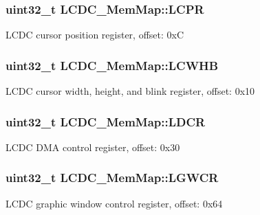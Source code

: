 \subsubsection[{L\+C\+P\+R}]{\setlength{\rightskip}{0pt plus 5cm}uint32\+\_\+t L\+C\+D\+C\+\_\+\+Mem\+Map\+::\+L\+C\+P\+R}\label{struct_l_c_d_c___mem_map_a54db054fbd1e4a7de44253909bbc8944}
L\+C\+D\+C cursor position register, offset\+: 0x\+C \hypertarget{struct_l_c_d_c___mem_map_a5766a743e828957c73257ebd66133a92}{}
\subsubsection[{L\+C\+W\+H\+B}]{\setlength{\rightskip}{0pt plus 5cm}uint32\+\_\+t L\+C\+D\+C\+\_\+\+Mem\+Map\+::\+L\+C\+W\+H\+B}\label{struct_l_c_d_c___mem_map_a5766a743e828957c73257ebd66133a92}
L\+C\+D\+C cursor width, height, and blink register, offset\+: 0x10 \hypertarget{struct_l_c_d_c___mem_map_a681d9ac7348e7f13c1211acce5621ce8}{}
\subsubsection[{L\+D\+C\+R}]{\setlength{\rightskip}{0pt plus 5cm}uint32\+\_\+t L\+C\+D\+C\+\_\+\+Mem\+Map\+::\+L\+D\+C\+R}\label{struct_l_c_d_c___mem_map_a681d9ac7348e7f13c1211acce5621ce8}
L\+C\+D\+C D\+M\+A control register, offset\+: 0x30 \hypertarget{struct_l_c_d_c___mem_map_aa76ae1b0e32e1bd9459d642326549adf}{}
\subsubsection[{L\+G\+W\+C\+R}]{\setlength{\rightskip}{0pt plus 5cm}uint32\+\_\+t L\+C\+D\+C\+\_\+\+Mem\+Map\+::\+L\+G\+W\+C\+R}\label{struct_l_c_d_c___mem_map_aa76ae1b0e32e1bd9459d642326549adf}
L\+C\+D\+C graphic window control register, offset\+: 0x64 \hypertarget{struct_l_c_d_c___mem_map_aef253853dccb165217b00da5fbe3b95f}{}

